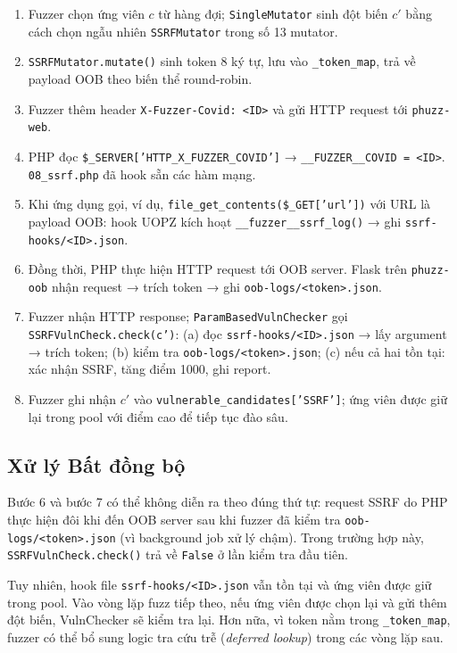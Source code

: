 \begin{enumerate}
    \item Fuzzer chọn ứng viên $c$ từ hàng đợi; \texttt{SingleMutator} sinh
    đột biến $c'$ bằng cách chọn ngẫu nhiên \texttt{SSRFMutator} trong số
    13 mutator.
    \item \texttt{SSRFMutator.mutate()} sinh token 8 ký tự, lưu vào
    \texttt{\_token\_map}, trả về payload OOB theo biến thể round-robin.
    \item Fuzzer thêm header \texttt{X-Fuzzer-Covid: <ID>} và gửi HTTP
    request tới \texttt{phuzz-web}.
    \item PHP đọc \texttt{\$\_SERVER['HTTP\_X\_FUZZER\_COVID']} →
    \texttt{\_\_FUZZER\_\_COVID = <ID>}. \texttt{08\_ssrf.php} đã hook sẵn
    các hàm mạng.
    \item Khi ứng dụng gọi, ví dụ,
    \texttt{file\_get\_contents(\$\_GET['url'])} với URL là payload OOB:
    hook UOPZ kích hoạt \texttt{\_\_fuzzer\_\_ssrf\_log()} → ghi
    \texttt{ssrf-hooks/<ID>.json}.
    \item Đồng thời, PHP thực hiện HTTP request tới OOB server.
    Flask trên \texttt{phuzz-oob} nhận request → trích token → ghi
    \texttt{oob-logs/<token>.json}.
    \item Fuzzer nhận HTTP response; \texttt{ParamBasedVulnChecker} gọi
    \texttt{SSRFVulnCheck.check(c')}:
    (a) đọc \texttt{ssrf-hooks/<ID>.json} → lấy argument → trích token;
    (b) kiểm tra \texttt{oob-logs/<token>.json};
    (c) nếu cả hai tồn tại: xác nhận SSRF, tăng điểm 1000, ghi report.
    \item Fuzzer ghi nhận $c'$ vào \texttt{vulnerable\_candidates['SSRF']};
    ứng viên được giữ lại trong pool với điểm cao để tiếp tục đào sâu.
\end{enumerate}

\subsection{Xử lý Bất đồng bộ}

Bước 6 và bước 7 có thể không diễn ra theo đúng thứ tự: request SSRF do PHP
thực hiện đôi khi đến OOB server sau khi fuzzer đã kiểm tra
\texttt{oob-logs/<token>.json} (vì background job xử lý chậm). Trong
trường hợp này, \texttt{SSRFVulnCheck.check()} trả về \texttt{False} ở
lần kiểm tra đầu tiên.

Tuy nhiên, hook file \texttt{ssrf-hooks/<ID>.json} vẫn tồn tại và ứng viên
được giữ trong pool. Vào vòng lặp fuzz tiếp theo, nếu ứng viên được chọn lại
và gửi thêm đột biến, VulnChecker sẽ kiểm tra lại. Hơn nữa, vì token nằm
trong \texttt{\_token\_map}, fuzzer có thể bổ sung logic tra cứu trễ
(\textit{deferred lookup}) trong các vòng lặp sau.

